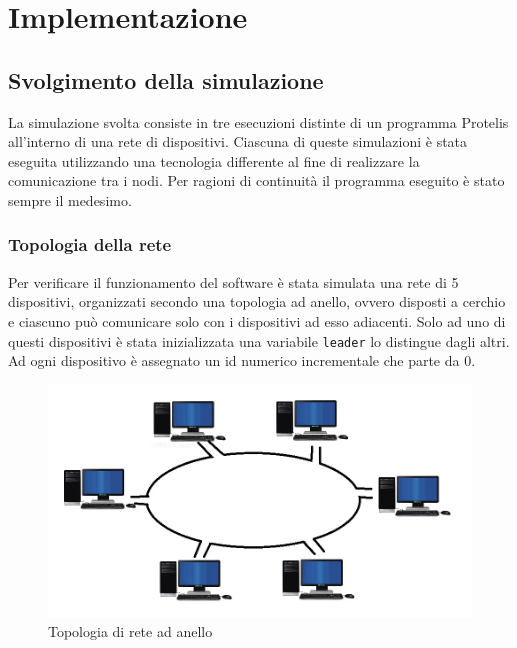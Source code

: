 \section{Implementazione}

\subsection{Svolgimento della simulazione}
La simulazione svolta consiste in tre esecuzioni distinte di un programma
Protelis all'interno di una rete di dispositivi. Ciascuna di queste simulazioni
è stata eseguita utilizzando una tecnologia differente al fine di realizzare la
comunicazione tra i nodi. Per ragioni di continuità il programma eseguito è
stato sempre il medesimo.

\subsubsection{Topologia della rete}
Per verificare il funzionamento del software è stata simulata una rete di 5
dispositivi, organizzati secondo una topologia ad anello, ovvero disposti a
cerchio e ciascuno può comunicare solo con i dispositivi ad esso
adiacenti. Solo ad uno di questi dispositivi è stata inizializzata una variabile
\texttt{leader} lo distingue dagli altri. Ad ogni dispositivo è assegnato un id
numerico incrementale che parte da 0.

\begin{figure}[H]
  \centering
  \includegraphics[width=\linewidth]{media/ring-network.jpg}
  \caption{Topologia di rete ad anello}
  \label{fig:1}
\end{figure}

